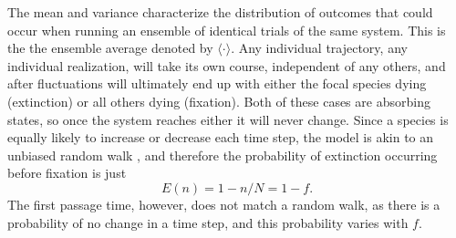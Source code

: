 The mean and variance characterize the distribution of outcomes that could occur when running an ensemble of identical trials of the same system. 
This is the the ensemble average denoted by $\langle \cdot \rangle$. 
Any individual trajectory, any individual realization, will take its own course, independent of any others, and after fluctuations will ultimately end up with either the focal species dying (extinction) or all others dying (fixation). 
Both of these cases are absorbing states, so once the system reaches either it will never change.
Since a species is equally likely to increase or decrease each time step, the model is akin to an unbiased random walk \cite{Gardiner2004}, and therefore the probability of extinction occurring before fixation is just
\begin{equation}
E(n) = 1-n/N = 1-f.
\end{equation}
The first passage time, however, does not match a random walk, as there is a probability of no change in a time step, and this probability varies with $f$.

